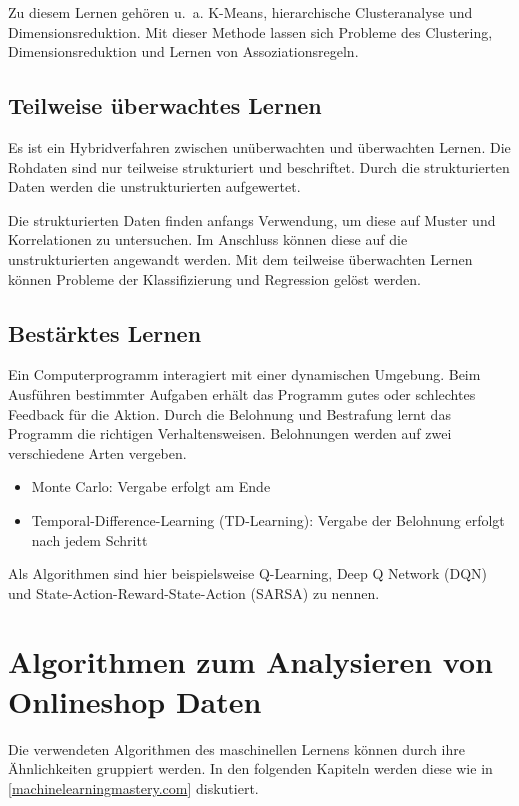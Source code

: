 Zu diesem Lernen gehören u. a. K-Means, hierarchische Clusteranalyse und Dimensionsreduktion. Mit dieser Methode lassen sich Probleme des Clustering, Dimensionsreduktion und Lernen von Assoziationsregeln.

\subsection{Teilweise überwachtes Lernen}
Es ist ein Hybridverfahren zwischen unüberwachten und überwachten Lernen. Die Rohdaten sind nur teilweise strukturiert und beschriftet. Durch die strukturierten Daten werden die unstrukturierten aufgewertet.\vspace{0.2cm}

Die strukturierten Daten finden anfangs Verwendung, um diese auf Muster und Korrelationen zu untersuchen. Im Anschluss können diese auf die unstrukturierten angewandt werden. Mit dem teilweise überwachten Lernen können Probleme der Klassifizierung und Regression gelöst werden.

\subsection{Bestärktes Lernen}
Ein Computerprogramm interagiert mit einer dynamischen Umgebung. Beim Ausführen bestimmter Aufgaben erhält das Programm gutes oder schlechtes Feedback für die Aktion. Durch die Belohnung und Bestrafung lernt das Programm die richtigen Verhaltensweisen. Belohnungen werden auf zwei verschiedene Arten vergeben.

\begin{itemize}
	\item Monte Carlo: Vergabe erfolgt am Ende
	\item Temporal-Difference-Learning (TD-Learning): Vergabe der Belohnung erfolgt nach jedem Schritt
\end{itemize}

Als Algorithmen sind hier beispielsweise Q-Learning, Deep Q Network (DQN) und State-Action-Reward-State-Action (SARSA) zu nennen.

\section{Algorithmen zum Analysieren von Onlineshop Daten}
Die verwendeten Algorithmen des maschinellen Lernens können durch ihre Ähnlichkeiten gruppiert werden. In den folgenden Kapiteln werden diese wie in [\href{https://machinelearningmastery.com/a-tour-of-machine-learning-algorithms}{machinelearningmastery.com}] diskutiert.


